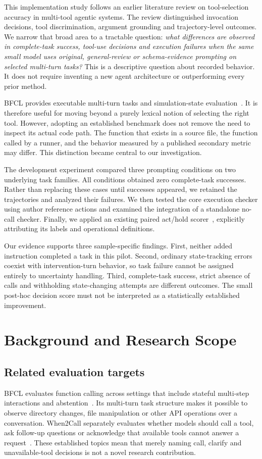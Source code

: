 \documentclass[conference]{IEEEtran}
\begin{document}
This implementation study follows an earlier literature review on tool-selection accuracy in multi-tool agentic systems. The review distinguished invocation decisions, tool discrimination, argument grounding and trajectory-level outcomes. We narrow that broad area to a tractable question: \emph{what differences are observed in complete-task success, tool-use decisions and execution failures when the same small model uses original, general-review or schema-evidence prompting on selected multi-turn tasks?} This is a descriptive question about recorded behavior. It does not require inventing a new agent architecture or outperforming every prior method.

BFCL provides executable multi-turn tasks and simulation-state evaluation~\cite{patil2025bfcl,gorillacode}. It is therefore useful for moving beyond a purely lexical notion of selecting the right tool. However, adopting an established benchmark does not remove the need to inspect its actual code path. The function that exists in a source file, the function called by a runner, and the behavior measured by a published secondary metric may differ. This distinction became central to our investigation.

The development experiment compared three prompting conditions on two underlying task families. All conditions obtained zero complete-task successes. Rather than replacing these cases until successes appeared, we retained the trajectories and analyzed their failures. We then tested the core execution checker using author reference actions and examined the integration of a standalone no-call checker. Finally, we applied an existing paired act/hold scorer~\cite{liu2026asking}, explicitly attributing its labels and operational definitions.

Our evidence supports three sample-specific findings. First, neither added instruction completed a task in this pilot. Second, ordinary state-tracking errors coexist with intervention-turn behavior, so task failure cannot be assigned entirely to uncertainty handling. Third, complete-task success, strict absence of calls and withholding state-changing attempts are different outcomes. The small post-hoc decision score must not be interpreted as a statistically established improvement.

\section{Background and Research Scope}
\subsection{Related evaluation targets}
BFCL evaluates function calling across settings that include stateful multi-step interactions and abstention~\cite{patil2025bfcl}. Its multi-turn task structure makes it possible to observe directory changes, file manipulation or other API operations over a conversation. When2Call separately evaluates whether models should call a tool, ask follow-up questions or acknowledge that available tools cannot answer a request~\cite{ross2025when2call}. These established topics mean that merely naming call, clarify and unavailable-tool decisions is not a novel research contribution.
\end{document}
